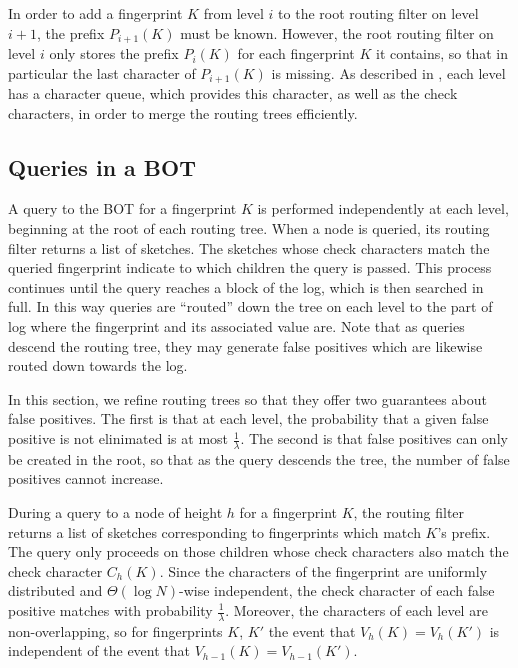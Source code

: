 In order to add a fingerprint $K$ from level $i$ to the root routing filter on
level $i+1$, the prefix $P_{i+1}(K)$ must be known. However, the root routing
filter on level $i$ only stores the prefix $P_i(K)$ for each fingerprint $K$ it
contains, so that in particular the last character of $P_{i+1}(K)$ is missing.
As described in , each level has a character queue,
which provides this character, as well as the check characters, in order to
merge the routing trees efficiently.

\subsection{Queries in a BOT}\label{sec:routing-tree-query}

A query to the BOT for a fingerprint $K$ is performed independently at each
level, beginning at the root of each routing tree. When a node is queried, its
routing filter returns a list of sketches. The sketches whose check characters
match the queried fingerprint indicate to which children the query is passed.
This process continues until the query reaches a block of the log, which is
then searched in full. In this way queries are ``routed'' down the tree on each
level to the part of log where the fingerprint and its associated value are.
Note that as queries descend the routing tree, they may generate false
positives which are likewise routed down towards the log.

In this section, we refine routing trees so that they offer two guarantees
about false positives. The first is that at each level, the probability that a
given false positive is not elinimated is at most $\frac{1}{\lambda}$. The
second is that false positives can only be created in the root, so that as the
query descends the tree, the number of false positives cannot increase.

During a query to a node of height $h$ for a fingerprint $K$, the routing
filter returns a list of sketches corresponding to fingerprints which match
$K$'s prefix. The query only proceeds on those children whose check characters
also match the check character $C_h(K)$. Since the characters of the
fingerprint are uniformly distributed and $\Theta(\log N)$-wise independent,
the check character of each false positive matches with probability
$\frac{1}{\lambda}$.  Moreover, the characters of each level are
non-overlapping, so for fingerprints $K$, $K'$ the event that $V_h(K)=V_h(K')$
is independent of the event that $V_{h-1}(K)=V_{h-1}(K')$.

